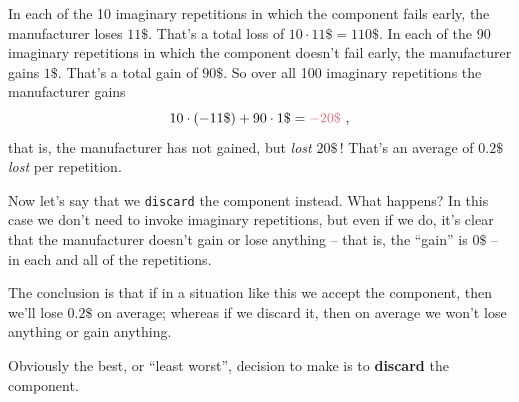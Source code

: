 \documentclass[
  a4paper,
  DIV=11,
  numbers=noendperiod,
  oneside]{scrreprt}
\begin{document}
In each of the 10 imaginary repetitions in which the component fails
early, the manufacturer loses \(11\$\). That's a total loss of
\(10 \cdot 11\$ = 110\$\). In each of the 90 imaginary repetitions in
which the component doesn't fail early, the manufacturer gains \(1\$\).
That's a total gain of \(90\$\). So over all 100 imaginary repetitions
the manufacturer gains \[
10\cdot (-11\$) + 90\cdot 1\$ = {\color[RGB]{238,102,119} -20\$} \ ,
\] that is, the manufacturer has not gained, but \emph{lost} \(20\$\)\,!
That's an average of \(0.2\$\) \emph{lost} per repetition.

Now let's say that we \texttt{discard} the component instead. What
happens? In this case we don't need to invoke imaginary repetitions, but
even if we do, it's clear that the manufacturer doesn't gain or lose
anything -- that is, the ``gain'' is \(0\$\) -- in each and all of the
repetitions.

The conclusion is that if in a situation like this we {accept} the
component, then we'll {lose \(0.2\$\)} on average; whereas if we
{discard} it, then on average we won't {lose anything or gain anything}.

Obviously the best, or ``least worst'', decision to make is to
\textbf{discard} the component.
\end{document}
